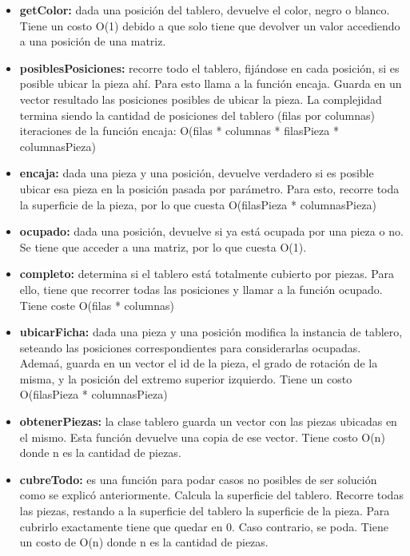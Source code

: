 \begin{itemize}

\item \textbf{getColor:} dada una posici\'on del tablero, devuelve el color, negro o blanco. Tiene un costo O(1) debido a que solo tiene que devolver un valor accediendo a una posici\'on de una matriz.

\item \textbf{posiblesPosiciones:} recorre todo el tablero, fij\'andose en cada posici\'on, si es posible ubicar la pieza ah\'i. Para esto llama a la funci\'on encaja. Guarda en un vector resultado las posiciones posibles de ubicar la pieza. La complejidad termina siendo la cantidad de posiciones del tablero (filas por columnas) iteraciones de la funci\'on encaja: O(filas * columnas * filasPieza * columnasPieza)

\item \textbf{encaja:} dada una pieza y una posici\'on, devuelve verdadero si es posible ubicar esa pieza en la posici\'on pasada por par\'ametro. Para esto, recorre toda la superficie de la pieza, por lo que cuesta O(filasPieza * columnasPieza)

\item \textbf{ocupado:} dada una posici\'on, devuelve si ya está ocupada por una pieza o no. Se tiene que acceder a una matriz, por lo que cuesta O(1).

\item \textbf{completo:} determina si el tablero est\'a totalmente cubierto por piezas. Para ello, tiene que recorrer todas las posiciones y llamar a la funci\'on ocupado. Tiene coste O(filas * columnas)

\item \textbf{ubicarFicha:} dada una pieza y una posici\'on modifica la instancia de tablero, seteando las posiciones correspondientes para considerarlas ocupadas. Adema\'a, guarda en un vector el id de la pieza, el grado de rotaci\'on de la misma, y la posici\'on del extremo superior izquierdo. Tiene un costo O(filasPieza * columnasPieza)

\item \textbf{obtenerPiezas:} la clase tablero guarda un vector con las piezas ubicadas en el mismo. Esta funci\'on devuelve una copia de ese vector. Tiene costo O(n) donde n es la cantidad de piezas.

\item \textbf{cubreTodo:} es una funci\'on para podar casos no posibles de ser soluci\'on como se explic\'o anteriormente. Calcula la superficie del tablero. Recorre todas las piezas, restando a la superficie del tablero la superficie de la pieza. Para cubrirlo exactamente tiene que quedar en 0. Caso contrario, se poda. Tiene un costo de O(n) donde n es la cantidad de piezas.

\end{itemize}

